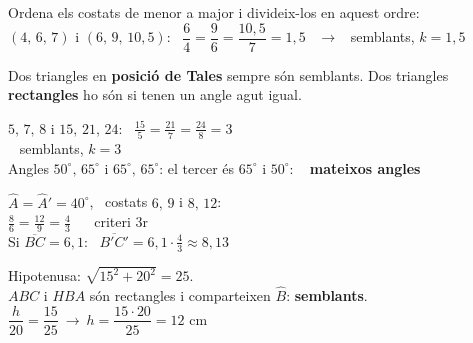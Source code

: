 \documentclass[11pt,a4paper]{article}
\newcommand{\heavy}{\fontseries{eb}\selectfont}
\newcommand{\be}[1]{{\color{fmok}\faCheckCircle}\ \ensuremath{#1}}
\begin{document}
\vfill
\begin{truc}
Ordena els costats de menor a major i divideix-los en aquest ordre:\\[3pt]
$(4,\,6,\,7)$ i $(6,\,9,\,10{,}5)$: \ $\dfrac64=\dfrac96=\dfrac{10{,}5}{7}=1{,}5$ \ $\to$ \ semblants, $k=1{,}5$
\end{truc}

\vfill
{\large Dos triangles en \textbf{posició de Tales} sempre són semblants. Dos triangles \textbf{rectangles} ho són si tenen un angle agut igual.}

\vfill
\begin{exemple}[Exemples]
\begin{minipage}[t]{0.48\linewidth}
$5,\,7,\,8$ i $15,\,21,\,24$: \ $\frac{15}{5}=\frac{21}{7}=\frac{24}{8}=3$\\ \be{} semblants, $\boxed{k=3}$\\[5pt]
Angles $50^\circ,\,65^\circ$ i $65^\circ,\,65^\circ$: el tercer és $65^\circ$ i $50^\circ$: \be{} \textbf{mateixos angles}
\end{minipage}\hfill
\begin{minipage}[t]{0.49\linewidth}
$\hat A=\hat A'=40^\circ$, \ costats $6,\,9$ i $8,\,12$:\\
$\frac86=\frac{12}{9}=\frac43$ \ \be{} criteri 3r\\[3pt]
Si $\overline{BC}=6{,}1$: \ $\overline{B'C'}=6{,}1\cdot\frac43\approx\boxed{8{,}13}$
\end{minipage}
\end{exemple}

\vfill
\begin{exemple}
\begin{minipage}[c]{0.6\linewidth}
Hipotenusa: $\sqrt{15^2+20^2}=25$.\\[3pt]
$ABC$ i $HBA$ són rectangles i comparteixen $\hat B$: \textbf{semblants}.\\[3pt]
$\dfrac{h}{20}=\dfrac{15}{25}\ \to\ h=\dfrac{15\cdot20}{25}=\boxed{12\text{ cm}}$
\end{minipage}\hfill
\begin{minipage}[c]{0.36\linewidth}\centering
{}
\end{minipage}
\end{exemple}
\end{document}
